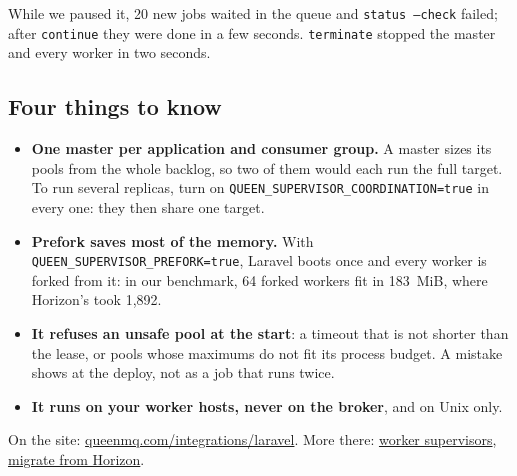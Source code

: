 While we paused it, 20 new jobs waited in the queue and \texttt{status --check} failed; after
\texttt{continue} they were done in a few seconds. \texttt{terminate} stopped the master and every
worker in two seconds.


\subsection{Four things to know}

\begin{itemize}
\item \textbf{One master per application and consumer group.} A master sizes its pools from the
whole backlog, so two of them would each run the full target. To run several replicas, turn on
\texttt{QUEEN\_SUPERVISOR\_COORDINATION=true} in every one: they then share one target.
\item \textbf{Prefork saves most of the memory.} With \texttt{QUEEN\_SUPERVISOR\_PREFORK=true},
Laravel boots once and every worker is forked from it: in our benchmark, 64 forked workers fit in
183~MiB, where Horizon's took 1,892.
\item \textbf{It refuses an unsafe pool at the start}: a timeout that is not shorter than the lease,
or pools whose maximums do not fit its process budget. A mistake shows at the deploy, not as a job
that runs twice.
\item \textbf{It runs on your worker hosts, never on the broker}, and on Unix only.
\end{itemize}

On the site: \href{https://queenmq.com/integrations/laravel/}{queenmq.com/integrations/laravel}. More
there: \href{https://queenmq.com/integrations/laravel/supervisors/}{worker supervisors},
\href{https://queenmq.com/integrations/laravel/migrate-from-horizon/}{migrate from Horizon}.
